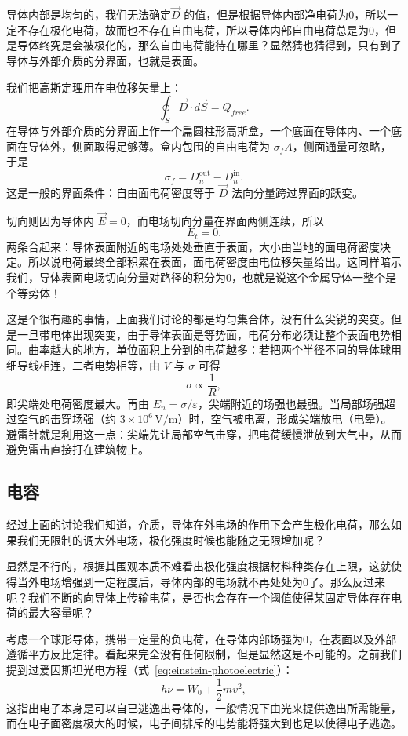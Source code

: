 \documentclass[UTF8]{ctexbook}
\begin{document}
导体内部是均匀的，我们无法确定$\vec{D}$ 的值，但是根据导体内部净电荷为$0$，所以一定不存在极化电荷，故而也不存在自由电荷，所以导体内部自由电荷总是为$0$，但是导体终究是会被极化的，那么自由电荷能待在哪里？显然猜也猜得到，只有到了导体与外部介质的分界面，也就是表面。

我们把高斯定理用在电位移矢量上：
\[
\oint_S\vec{D}\cdot d\vec{S}=Q_{free}.
\]
在导体与外部介质的分界面上作一个扁圆柱形高斯盒，一个底面在导体内、一个底面在导体外，侧面取得足够薄。盒内包围的自由电荷为 $\sigma_f A$，侧面通量可忽略，于是
\[
\sigma_f=D_n^{\mathrm{out}}-D_n^{\mathrm{in}}.
\]
这是一般的界面条件：自由面电荷密度等于 $\vec{D}$ 法向分量跨过界面的跃变。

切向则因为导体内 $\vec{E}=0$，而电场切向分量在界面两侧连续，所以
\[
E_t=0.
\]
两条合起来：导体表面附近的电场处处垂直于表面，大小由当地的面电荷密度决定。所以说电荷最终全部积累在表面，面电荷密度由电位移矢量给出。这同样暗示我们，导体表面电场切向分量对路径的积分为$0$，也就是说这个金属导体一整个是个等势体！

这是个很有趣的事情，上面我们讨论的都是均匀集合体，没有什么尖锐的突变。但是一旦带电体出现突变，由于导体表面是等势面，电荷分布必须让整个表面电势相同。曲率越大的地方，单位面积上分到的电荷越多：若把两个半径不同的导体球用细导线相连，二者电势相等，由 $V$ 与 $\sigma$ 可得
\[
\sigma\propto\frac{1}{R},
\]
即尖端处电荷密度最大。再由 $E_n=\sigma/\varepsilon$，尖端附近的场强也最强。当局部场强超过空气的击穿场强（约 $3\times10^6\,\mathrm{V/m}$）时，空气被电离，形成尖端放电（电晕）。避雷针就是利用这一点：尖端先让局部空气击穿，把电荷缓慢泄放到大气中，从而避免雷击直接打在建筑物上。

\subsection{电容}

经过上面的讨论我们知道，介质，导体在外电场的作用下会产生极化电荷，那么如果我们无限制的调大外电场，极化强度时候也能随之无限增加呢？

显然是不行的，根据其围观本质不难看出极化强度根据材料种类存在上限，这就使得当外电场增强到一定程度后，导体内部的电场就不再处处为$0$了。那么反过来呢？我们不断的向导体上传输电荷，是否也会存在一个阈值使得某固定导体存在电荷的最大容量呢？

考虑一个球形导体，携带一定量的负电荷，在导体内部场强为$0$，在表面以及外部遵循平方反比定律。看起来完全没有任何限制，但是显然这是不可能的。之前我们提到过爱因斯坦光电方程（式~\eqref{eq:einstein-photoelectric}）：
\begin{equation}
h\nu=W_0+\frac12 mv^2,
\label{eq:einstein-photoelectric}
\end{equation}
这指出电子本身是可以自已逃逸出导体的，一般情况下由光来提供逸出所需能量，而在电子面密度极大的时候，电子间排斥的电势能将强大到也足以使得电子逃逸。
\end{document}
